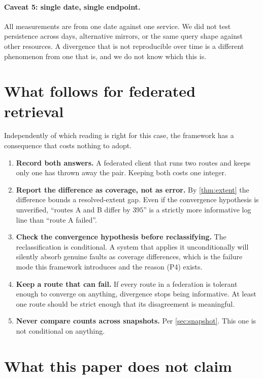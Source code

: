\documentclass[11pt,a4paper]{article}
\theoremstyle{plain}
\theoremstyle{definition}
\theoremstyle{remark}
\begin{document}
\paragraph{Caveat 5: single date, single endpoint.}
All measurements are from one date against one service. We did not test
persistence across days, alternative mirrors, or the same query shape against
other resources. A divergence that is not reproducible over time is a different
phenomenon from one that is, and we do not know which this is.

\section{What follows for federated retrieval}
\label{sec:practice}

Independently of which reading is right for this case, the framework has a
consequence that costs nothing to adopt.

\begin{enumerate}[label=(P\arabic*),leftmargin=3em]
\item \textbf{Record both answers.} A federated client that runs two routes and
keeps only one has thrown away the pair. Keeping both costs one integer.
\item \textbf{Report the difference as coverage, not as error.} By
\cref{thm:extent} the difference bounds a resolved-extent gap. Even if the
convergence hypothesis is unverified, ``routes A and B differ by $395$'' is a
strictly more informative log line than ``route A failed''.
\item \textbf{Check the convergence hypothesis before reclassifying.} The
reclassification is conditional. A system that applies it unconditionally will
silently absorb genuine faults as coverage differences, which is the failure
mode this framework introduces and the reason (P4) exists.
\item \textbf{Keep a route that can fail.} If every route in a federation is
tolerant enough to converge on anything, divergence stops being informative.
At least one route should be strict enough that its disagreement is meaningful.
\item \textbf{Never compare counts across snapshots.} Per \cref{sec:snapshot}.
This one is not conditional on anything.
\end{enumerate}

\section{What this paper does not claim}
\label{sec:whatnot}
\end{document}
